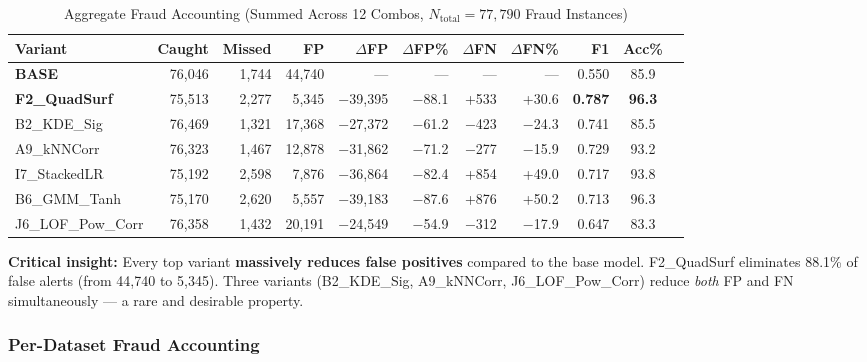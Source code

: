 \documentclass[journal]{IEEEtran}
\begin{document}
\begin{table}[!t]
\centering
\caption{Aggregate Fraud Accounting (Summed Across 12 Combos, $N_{\text{total}} = 77{,}790$ Fraud Instances)}
\label{tab:fraud_accounting}
\setlength{\tabcolsep}{4pt}
\begin{tabular}{@{}lrrrrrrrrcc@{}}
\toprule
\textbf{Variant} & \textbf{Caught} & \textbf{Missed} & \textbf{FP} & \textbf{$\Delta$FP} & \textbf{$\Delta$FP\%} & \textbf{$\Delta$FN} & \textbf{$\Delta$FN\%} & \textbf{F1} & \textbf{Acc\%} \\
\midrule
\textbf{BASE}         & 76{,}046 & 1{,}744  & 44{,}740  & ---       & ---     & ---   & ---     & 0.550 & 85.9 \\
\textbf{F2\_QuadSurf} & 75{,}513 & 2{,}277  & 5{,}345   & $-$39{,}395 & $-$88.1 & +533  & +30.6  & \textbf{0.787} & \textbf{96.3} \\
B2\_KDE\_Sig          & 76{,}469 & 1{,}321  & 17{,}368  & $-$27{,}372 & $-$61.2 & $-$423 & $-$24.3 & 0.741 & 85.5 \\
A9\_kNNCorr           & 76{,}323 & 1{,}467  & 12{,}878  & $-$31{,}862 & $-$71.2 & $-$277 & $-$15.9 & 0.729 & 93.2 \\
I7\_StackedLR         & 75{,}192 & 2{,}598  & 7{,}876   & $-$36{,}864 & $-$82.4 & +854  & +49.0  & 0.717 & 93.8 \\
B6\_GMM\_Tanh         & 75{,}170 & 2{,}620  & 5{,}557   & $-$39{,}183 & $-$87.6 & +876  & +50.2  & 0.713 & 96.3 \\
J6\_LOF\_Pow\_Corr    & 76{,}358 & 1{,}432  & 20{,}191  & $-$24{,}549 & $-$54.9 & $-$312 & $-$17.9 & 0.647 & 83.3 \\
\bottomrule
\end{tabular}
\end{table}

\textbf{Critical insight:} Every top variant \textbf{massively reduces false positives} compared to the base model. F2\_QuadSurf eliminates 88.1\% of false alerts (from 44{,}740 to 5{,}345). Three variants (B2\_KDE\_Sig, A9\_kNNCorr, J6\_LOF\_Pow\_Corr) reduce \textit{both} FP and FN simultaneously --- a rare and desirable property.

\subsubsection{Per-Dataset Fraud Accounting}
\end{document}
